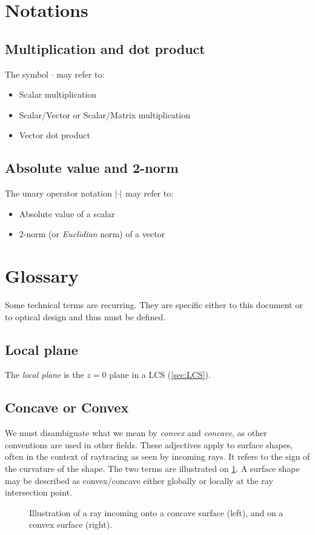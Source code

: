 \section{Notations}
\subsection{Multiplication and dot product}
The symbol $\cdot$ may refer to:
\begin{itemize}
\item Scalar multiplication
\item Scalar/Vector or Scalar/Matrix multiplication
\item Vector dot product
\end{itemize}

\subsection{Absolute value and 2-norm}
The unary operator notation $\abs{\cdot}$ may refer to:
\begin{itemize}
\item Absolute value of a scalar
\item 2-norm (or \emph{Euclidian} norm) of a vector
\end{itemize}

\section{Glossary}
Some technical terms are recurring. They are specific either to this document
or to optical design and thus must be defined.

\subsection{Local plane}
The \emph{local plane} is the $z=0$ plane in a \gls{LCS} (\cref{sec:LCS}).

\subsection{Concave or Convex}
We must disambiguate what we mean by \emph{convex} and \emph{concave}, as other
conventions are used in other fields. These adjectives apply to surface
shapes, often in the context of raytracing as seen by incoming rays.
It refers to the sign of the curvature of the shape.  The two terms are
illustrated on \cref{fig:concave-convex}. A surface shape may be described as
convex/concave either globally or locally at the ray intersection point.

\begin{figure} \caption{\label{fig:concave-convex} Illustration of a
ray incoming onto a concave surface (left), and on a convex surface (right).}

\end{figure}
